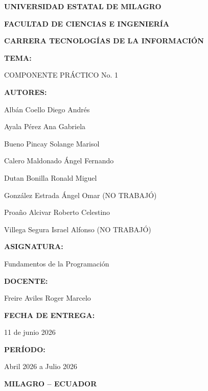 \documentclass[12pt,a4paper]{article}
\begin{document}
	
	
	\begin{titlepage}
		\centering
		
		\vspace*{1cm}
		
		{\Large\bfseries UNIVERSIDAD ESTATAL DE MILAGRO\par}
		\vspace{0.5cm}
		
		{\large\bfseries FACULTAD DE CIENCIAS E INGENIERÍA\par}
		{\large\bfseries CARRERA TECNOLOGÍAS DE LA INFORMACIÓN\par}
		
		\vspace{1.5cm}
		
		{\bfseries TEMA:\par}
		\vspace{0.2cm}
		COMPONENTE PRÁCTICO No. 1
		
		\vspace{1cm}
		
		{\bfseries AUTORES:\par}
		\vspace{0.3cm}
		Albán Coello Diego Andrés\par
		Ayala Pérez Ana Gabriela\par
		Bueno Pincay Solange Marisol\par
		Calero Maldonado Ángel Fernando\par
		Dutan Bonilla Ronald Miguel\par
		González Estrada Ángel Omar (NO TRABAJÓ)\par
		Proaño Alcivar Roberto Celestino\par
		Villega Segura Israel Alfonso (NO TRABAJÓ)\par
		
		\vspace{1cm}
		
		{\bfseries ASIGNATURA:\par}
		Fundamentos de la Programación
		
		\vspace{0.5cm}
		
		{\bfseries DOCENTE:\par}
		Freire Aviles Roger Marcelo
		
		\vspace{0.5cm}
		
		{\bfseries FECHA DE ENTREGA:\par}
		11 de junio 2026
		
		\vspace{0.5cm}
		
		{\bfseries PERÍODO:\par}
		Abril 2026 a Julio 2026
		
		\vfill
		
		{\bfseries MILAGRO -- ECUADOR\par}
		
	\end{titlepage}
	
\end{document}
